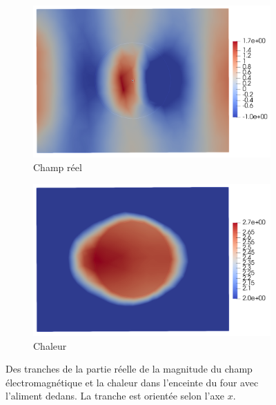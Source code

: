 \begin{figure}[H]
    \centering
    \begin{subfigure}{.5\textwidth}
        \centering
        \includegraphics[scale=0.15]{figures/helmholtz/helmholtz_reel_reflexion3.png}
        \caption{Champ réel}
    \end{subfigure}%
    \begin{subfigure}{.5\textwidth}
        \centering
        \includegraphics[scale=0.15]{figures/chaleur/chaleur_reflexion1.png}
        \caption{Chaleur}
    \end{subfigure}
    \caption{Des tranches de la partie réelle de la magnitude du champ
    électromagnétique et la chaleur dans l'enceinte du four avec
    l'aliment dedans. La tranche est orientée selon l'axe $x$.}
\end{figure}
